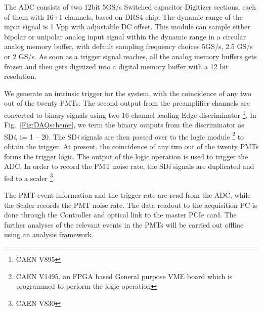 The ADC consists of two 12bit 5GS/s Switched capacitor Digitizer sections, 
each of them with 16+1 channels, based on DRS4 chip. The dynamic range of the input 
signal is 1 Vpp with adjustable DC offset. This module can sample either bipolar or 
unipolar analog input signal within the dynamic range in a circular 
analog memory buffer, with default sampling frequency choices 5GS/s, 2.5 GS/s 
or 2 GS/s. As soon as a trigger signal reaches, all the analog memory 
buffers gets frozen and then gets digitized into a digital memory buffer 
with a 12 bit resolution. 

We generate an intrinsic trigger for the system, 
with the coincidence of any two out of the twenty PMTs. The second output from the 
preamplifier channels are converted to binary signals using two 16 channel leading 
Edge discriminator \footnote{CAEN V895}. In Fig.~\ref{Fig:DAQscheme}, we term the binary 
outputs from the discriminator as SD{\it i}, i= 1 -- 20. The SD{\it i} signals are then passed over to 
the logic module \footnote{CAEN V1495, an FPGA based General purpose VME board which is programmed to perform the 
logic operation} to obtain the trigger. At present, the coincidence of any two out 
of the twenty PMTs forms the trigger logic. The output of the logic operation is 
used to trigger the ADC. In order to record the PMT noise rate, the 
SD{\it i} signals are duplicated and fed to a scaler \footnote{CAEN V830}.




The PMT event information and the trigger rate are read from the ADC, while the Scaler 
records the PMT noise rate. The data readout to the acquisition PC is done through the 
Controller and optical link to the master PCIe card. The further analyses of the 
relevant events in the PMTs will be carried out offline using an analysis 
framework.





